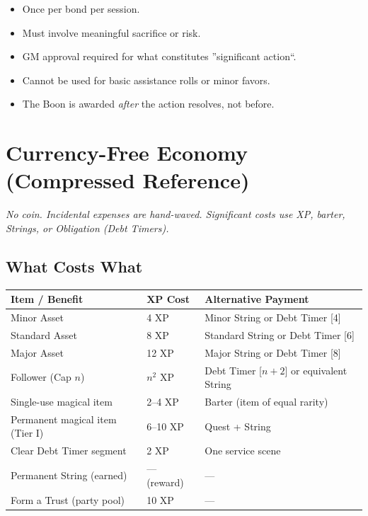 \begin{itemize}
    \item Once per bond per session.
    \item Must involve meaningful sacrifice or risk.
    \item GM approval required for what constitutes ''significant action``.
    \item Cannot be used for basic assistance rolls or minor favors.
    \item The Boon is awarded \emph{after} the action resolves, not before.
\end{itemize}

\section{Currency-Free Economy (Compressed Reference)}
\label{sec:currency-free-ref}

\begin{tcolorbox}[colback=blue!5!white,colframe=blue!70!black,title=Quick Reference,breakable]
\emph{No coin. Incidental expenses are hand-waved. Significant costs use XP, barter, Strings, or Obligation (Debt Timers).}
\end{tcolorbox}

\subsection{What Costs What}
\label{ref:costs-table}

\begin{center}
\small
\begin{tabular}{lll}
\toprule
\textbf{Item / Benefit} & \textbf{XP Cost} & \textbf{Alternative Payment} \\
\midrule
Minor Asset & 4 XP & Minor String or Debt Timer [4] \\
Standard Asset & 8 XP & Standard String or Debt Timer [6] \\
Major Asset & 12 XP & Major String or Debt Timer [8] \\
Follower (Cap $n$) & $n^2$ XP & Debt Timer [$n+2$] or equivalent String \\
Single-use magical item & 2--4 XP & Barter (item of equal rarity) \\
Permanent magical item (Tier I) & 6--10 XP & Quest + String \\
Clear Debt Timer segment & 2 XP & One service scene \\
Permanent String (earned) & --- (reward) & --- \\
Form a Trust (party pool) & 10 XP & --- \\
\bottomrule
\end{tabular}
\end{center}

